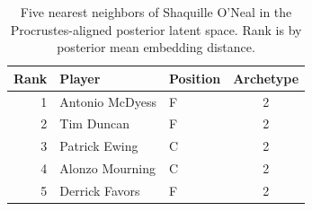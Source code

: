 \begin{table}[htbp]
  \centering\small
  \begin{tabular}{rllc}
    \toprule
    Rank & Player & Position & Archetype \\
    \midrule
    1 & Antonio McDyess & F & 2 \\
    2 & Tim Duncan & F & 2 \\
    3 & Patrick Ewing & C & 2 \\
    4 & Alonzo Mourning & C & 2 \\
    5 & Derrick Favors & F & 2 \\
    \bottomrule
  \end{tabular}
  \caption{Five nearest neighbors of Shaquille O'Neal in the Procrustes-aligned posterior latent space. Rank is by posterior mean embedding distance.}
  \label{tab:Shaquille_O_Neal_neighbors}
\end{table}

